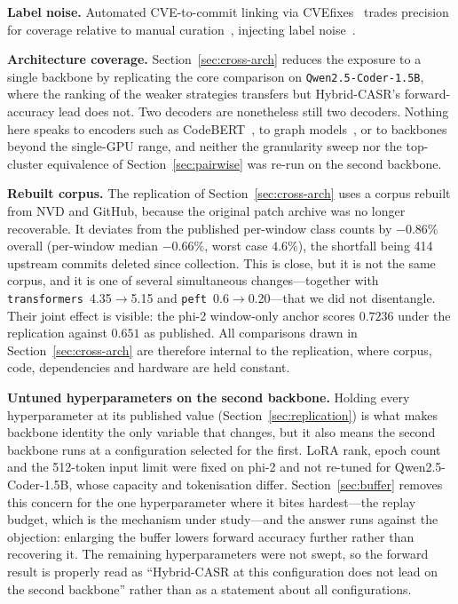 \documentclass[a4paper,twoside]{article}
\begin{document}
\textbf{Label noise.} Automated CVE-to-commit linking via CVEfixes~\citep{Bhandari2021CVEfixes} trades precision for coverage relative to manual curation~\citep{Ponta2019Dataset}, injecting label noise~\citep{Morrison2015HotSOS}.

\textbf{Architecture coverage.} Section~\ref{sec:cross-arch} reduces the exposure to a single backbone by replicating the core comparison on \texttt{Qwen2.5-Coder-1.5B}, where the ranking of the weaker strategies transfers but Hybrid-CASR's forward-accuracy lead does not. Two decoders are nonetheless still two decoders. Nothing here speaks to encoders such as CodeBERT~\citep{Feng2020CodeBERT}, to graph models~\citep{Zhou2019Devign,Cao2021BGNN4VD}, or to backbones beyond the single-GPU range, and neither the granularity sweep nor the top-cluster equivalence of Section~\ref{sec:pairwise} was re-run on the second backbone.

\textbf{Rebuilt corpus.} The replication of Section~\ref{sec:cross-arch} uses a corpus rebuilt from NVD and GitHub, because the original patch archive was no longer recoverable. It deviates from the published per-window class counts by $-0.86\%$ overall (per-window median $-0.66\%$, worst case $4.6\%$), the shortfall being 414 upstream commits deleted since collection. This is close, but it is not the same corpus, and it is one of several simultaneous changes---together with \texttt{transformers}~4.35$\rightarrow$5.15 and \texttt{peft}~0.6$\rightarrow$0.20---that we did not disentangle. Their joint effect is visible: the phi-2 window-only anchor scores $0.7236$ under the replication against $0.651$ as published. All comparisons drawn in Section~\ref{sec:cross-arch} are therefore internal to the replication, where corpus, code, dependencies and hardware are held constant.

\textbf{Untuned hyperparameters on the second backbone.} Holding every hyperparameter at its published value (Section~\ref{sec:replication}) is what makes backbone identity the only variable that changes, but it also means the second backbone runs at a configuration selected for the first. LoRA rank, epoch count and the 512-token input limit were fixed on phi-2 and not re-tuned for Qwen2.5-Coder-1.5B, whose capacity and tokenisation differ. Section~\ref{sec:buffer} removes this concern for the one hyperparameter where it bites hardest---the replay budget, which is the mechanism under study---and the answer runs against the objection: enlarging the buffer lowers forward accuracy further rather than recovering it. The remaining hyperparameters were not swept, so the forward result is properly read as ``Hybrid-CASR at this configuration does not lead on the second backbone'' rather than as a statement about all configurations.
\end{document}
